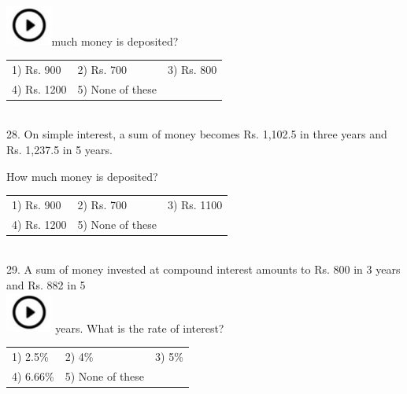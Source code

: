 \documentclass{article}
\begin{document}
	\noindent  
\noindent \\ \includegraphics*[width=0.60in, height=0.52in]{images/image1}much money is deposited?
	
	\noindent \begin{tabular}{p{1.7in} p{1.6in} p{1.6in}} \\ 
 1) Rs. 900                   &  2) Rs. 700            &  3) Rs. 800            \\
4) Rs. 1200          & 5) None of these  \\
\end{tabular}
	
	\noindent 
	
	\noindent 
	
	\noindent  \\ 28. On simple interest, a sum of money becomes Rs. 1,102.5 in three years and Rs. 1,237.5 in 5 years.
	
	\noindent 
	
	\noindent How much money is deposited?
	
	\noindent 
	
	\noindent \begin{tabular}{p{1.7in} p{1.6in} p{1.6in}} \\ 
 1) Rs. 900                   &  2) Rs. 700            &  3) Rs. 1100          \\
4) Rs. 1200          & 5) None of these  \\
\end{tabular}
	
	\noindent  \\ 
	
	29. A sum of money invested at compound interest amounts to Rs. 800 in 3 years and Rs. 882 in 5  
\noindent \\ \includegraphics*[width=0.60in, height=0.52in]{images/image1} years. What is the rate of interest?
	
	\noindent \begin{tabular}{p{1.7in} p{1.6in} p{1.6in}} \\ 
 1) 2.5\%                   &  2) 4\%                &  3) 5\%                \\
4) 6.66\%           & 5) None of these  \\
\end{tabular}
	
\end{document}
